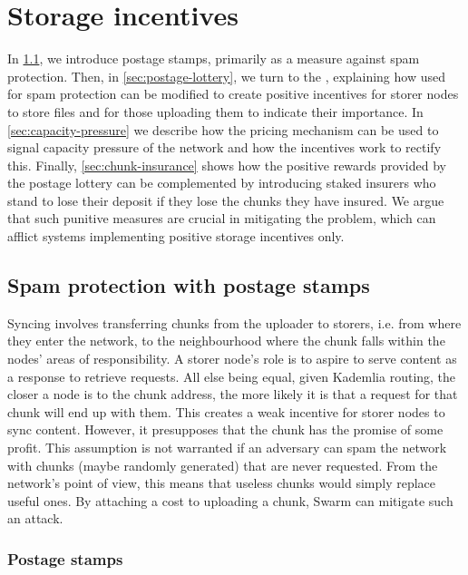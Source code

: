 \section{Storage incentives \statusyellow}\label{sec:storage-incentives}


In \ref{sec:postage-stamps}, we introduce postage stamps, primarily as a measure against spam protection.  
Then, in \ref{sec:postage-lottery}, we turn to the , explaining how  used for spam protection can be modified to create positive incentives for storer nodes to store files and for those uploading them to indicate their importance. In \ref{sec:capacity-pressure} we describe how the pricing mechanism can be used to signal capacity pressure of the network and how the incentives work to rectify this. Finally, \ref{sec:chunk-insurance} shows how the  positive rewards provided by the postage lottery can be complemented by introducing staked insurers who stand to lose their deposit if they lose  the chunks they have insured. We argue that such punitive measures are crucial in mitigating the  problem, which can afflict systems implementing positive storage incentives only. 

\subsection{Spam protection with postage stamps\statusgreen}\label{sec:postage-stamps}
\green{}

Syncing involves transferring chunks from the uploader to storers, i.e. from where they enter the network, to the neighbourhood where the chunk falls within the nodes' areas of responsibility. A storer node's role is to aspire to serve content as a response to retrieve requests. All else being equal, given Kademlia routing, the closer a node is to the chunk address, the more likely it is that a request for that chunk will end up with them. This creates a weak incentive for storer nodes to sync content. However, it presupposes that the chunk has the promise of some profit. This assumption is not warranted if an adversary can spam the network with chunks (maybe randomly generated) that are never requested. From the network's point of view, this means that useless chunks would simply replace useful ones. By attaching a cost to uploading a chunk, Swarm can mitigate such an attack.


\subsubsection{Postage stamps}

